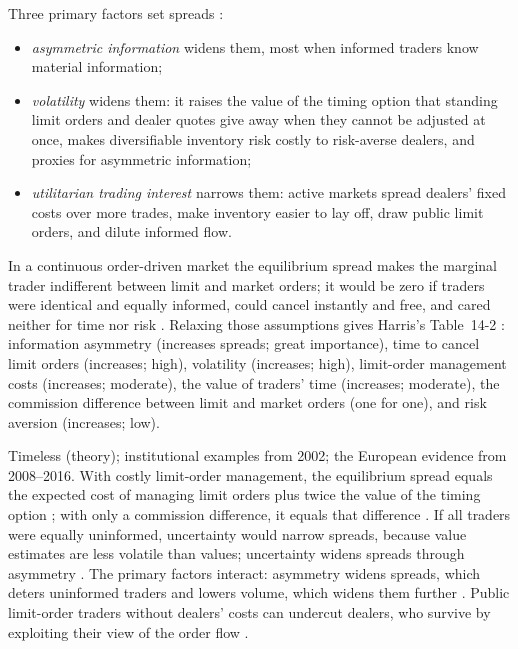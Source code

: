 \begin{qfresult}\label{res:spread-determinants}
 Three primary factors set spreads \citep[chap.~``Bid/Ask Spreads'', sec.~14.6.1, pp.~311--313]{alpha-harris}:
\begin{itemize}
\item \emph{asymmetric information} widens them, most when informed traders know material information;
\item \emph{volatility} widens them: it raises the value of the timing option that standing limit orders and dealer quotes give away when they cannot be adjusted at once, makes diversifiable inventory risk costly to risk-averse dealers, and proxies for asymmetric information;
\item \emph{utilitarian trading interest} narrows them: active markets spread dealers' fixed costs over more trades, make inventory easier to lay off, draw public limit orders, and dilute informed flow.
\end{itemize}
In a continuous order-driven market the equilibrium spread makes the marginal trader indifferent between limit and market orders; it would be zero if traders were identical and equally informed, could cancel instantly and free, and cared neither for time nor risk \citep[same chap., secs.~14.4.1--14.4.2, pp.~304--310]{alpha-harris}. Relaxing those assumptions gives Harris's Table~14-2 \citep[same chap., p.~311]{alpha-harris}: information asymmetry (increases spreads; great importance), time to cancel limit orders (increases; high), volatility (increases; high), limit-order management costs (increases; moderate), the value of traders' time (increases; moderate), the commission difference between limit and market orders (one for one), and risk aversion (increases; low).

 Timeless (theory); institutional examples from 2002; the European evidence from 2008--2016. With costly limit-order management, the equilibrium spread equals the expected cost of managing limit orders plus twice the value of the timing option \citep[same chap., p.~307]{alpha-harris}; with only a commission difference, it equals that difference \citep[same chap., p.~306]{alpha-harris}. If all traders were equally uninformed, uncertainty would narrow spreads, because value estimates are less volatile than values; uncertainty widens spreads through asymmetry \citep[same chap., p.~310]{alpha-harris}. The primary factors interact: asymmetry widens spreads, which deters uninformed traders and lowers volume, which widens them further \citep[same chap., p.~312]{alpha-harris}. Public limit-order traders without dealers' costs can undercut dealers, who survive by exploiting their view of the order flow \citep[same chap., sec.~14.5, pp.~310--311]{alpha-harris}.


\end{qfresult}

